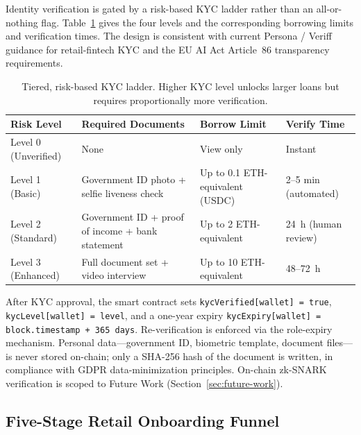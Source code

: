 \documentclass[12pt,a4paper]{report}
\newcommand{\tableheadcolor}{\rowcolor{TableHeadBg}}
\begin{document}
\label{sec:tiered-kyc}

Identity verification is gated by a risk-based KYC ladder rather than an all-or-nothing flag. Table~\ref{tab:tiered-kyc} gives the four levels and the corresponding borrowing limits and verification times. The design is consistent with current Persona / Veriff guidance for retail-fintech KYC and the EU AI Act Article~86 transparency requirements.

\begin{table}[H]
\centering
\caption[Tiered, risk-based KYC ladder]{Tiered, risk-based KYC ladder. Higher KYC level unlocks larger loans but requires proportionally more verification.}
\label{tab:tiered-kyc}
\begin{tabular}{p{2.2cm}p{5.8cm}p{2.8cm}p{2.6cm}}
\toprule
\tableheadcolor
\textbf{Risk Level} & \textbf{Required Documents} & \textbf{Borrow Limit} & \textbf{Verify Time} \\
\midrule
Level 0 (Unverified) & None & View only & Instant \\
Level 1 (Basic) & Government ID photo + selfie liveness check & Up to 0.1 ETH-equivalent (USDC) & 2--5 min (automated) \\
Level 2 (Standard) & Government ID + proof of income + bank statement & Up to 2 ETH-equivalent & 24~h (human review) \\
Level 3 (Enhanced) & Full document set + video interview & Up to 10 ETH-equivalent & 48--72~h \\
\bottomrule
\end{tabular}
\end{table}

After KYC approval, the smart contract sets \texttt{kycVerified[wallet] = true}, \texttt{kycLevel[wallet] = level}, and a one-year expiry \texttt{kycExpiry[wallet] = block.timestamp + 365 days}. Re-verification is enforced via the role-expiry mechanism. Personal data---government ID, biometric template, document files---is never stored on-chain; only a SHA-256 hash of the document is written, in compliance with GDPR data-minimization principles. On-chain zk-SNARK verification is scoped to Future Work (Section~\ref{sec:future-work}).

\subsection{Five-Stage Retail Onboarding Funnel}
\label{sec:funnel}
\end{document}
